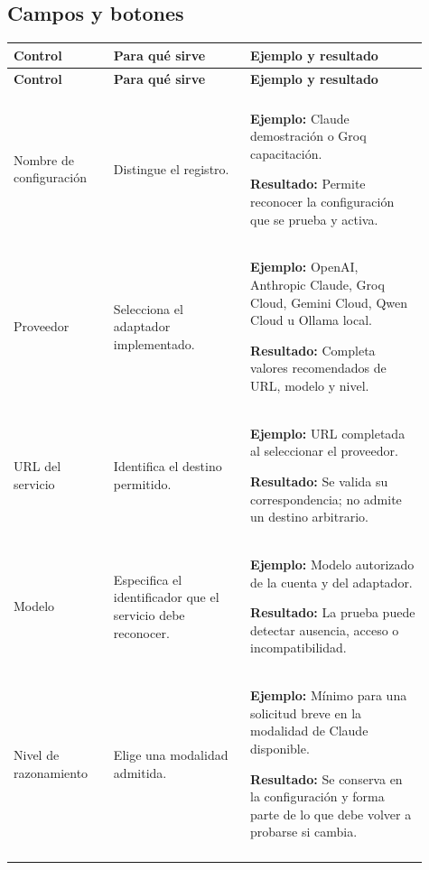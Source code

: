 \subsection{Campos y botones}
\begingroup
\fontsize{10}{12.5}\selectfont
\setlength{\tabcolsep}{5pt}
\renewcommand{\arraystretch}{1.15}
\begin{longtable}{@{}>{\RaggedRight\arraybackslash}p{0.22\linewidth}>{\RaggedRight\arraybackslash}p{0.3\linewidth}>{\RaggedRight\arraybackslash}p{0.39\linewidth}@{}}
\toprule
\textbf{Control} & \textbf{Para qué sirve} & \textbf{Ejemplo y resultado} \\
\midrule
\endfirsthead
\toprule
\textbf{Control} & \textbf{Para qué sirve} & \textbf{Ejemplo y resultado} \\
\midrule
\endhead
\midrule
\multicolumn{3}{r}{\footnotesize Continúa en la página siguiente}\\
\endfoot
\bottomrule
\endlastfoot
Nombre de configuración & Distingue el registro. & \textbf{Ejemplo:} Claude demostración o Groq capacitación.\par\smallskip\textbf{Resultado:} Permite reconocer la configuración que se prueba y activa. \\
\addlinespace[3pt]
Proveedor & Selecciona el adaptador implementado. & \textbf{Ejemplo:} OpenAI, Anthropic Claude, Groq Cloud, Gemini Cloud, Qwen Cloud u Ollama local.\par\smallskip\textbf{Resultado:} Completa valores recomendados de URL, modelo y nivel. \\
\addlinespace[3pt]
URL del servicio & Identifica el destino permitido. & \textbf{Ejemplo:} URL completada al seleccionar el proveedor.\par\smallskip\textbf{Resultado:} Se valida su correspondencia; no admite un destino arbitrario. \\
\addlinespace[3pt]
Modelo & Especifica el identificador que el servicio debe reconocer. & \textbf{Ejemplo:} Modelo autorizado de la cuenta y del adaptador.\par\smallskip\textbf{Resultado:} La prueba puede detectar ausencia, acceso o incompatibilidad. \\
\addlinespace[3pt]
Nivel de razonamiento & Elige una modalidad admitida. & \textbf{Ejemplo:} Mínimo para una solicitud breve en la modalidad de Claude disponible.\par\smallskip\textbf{Resultado:} Se conserva en la configuración y forma parte de lo que debe volver a probarse si cambia. \\
\addlinespace[3pt]

\end{longtable}
